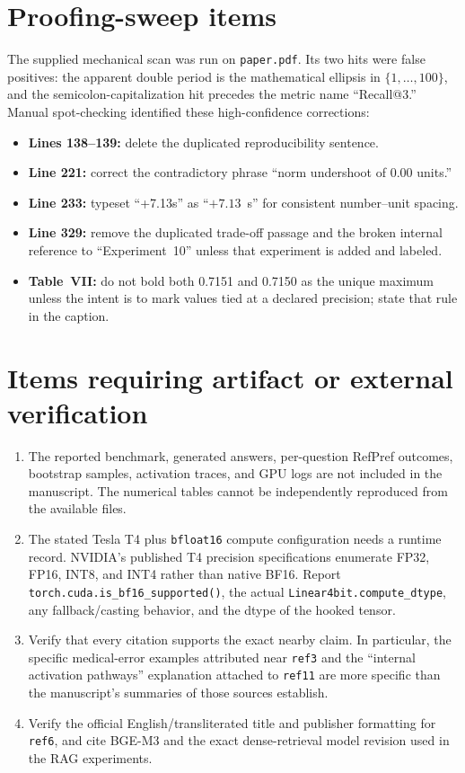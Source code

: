 \documentclass[11pt]{article}
\newcommand{\status}[1]{\textbf{#1}}
\begin{document}
\section*{Proofing-sweep items}

The supplied mechanical scan was run on \texttt{paper.pdf}.  Its two hits were false positives: the apparent double period is the mathematical ellipsis in $\{1,\ldots,100\}$, and the semicolon-capitalization hit precedes the metric name ``Recall@3.''  Manual spot-checking identified these high-confidence corrections:

\begin{itemize}
    \item \status{Lines 138--139:} delete the duplicated reproducibility sentence.
    \item \status{Line 221:} correct the contradictory phrase ``norm undershoot of $0.00$ units.''
    \item \status{Line 233:} typeset ``+7.13s'' as ``$+7.13$~s'' for consistent number--unit spacing.
    \item \status{Line 329:} remove the duplicated trade-off passage and the broken internal reference to ``Experiment~10'' unless that experiment is added and labeled.
    \item \status{Table~VII:} do not bold both 0.7151 and 0.7150 as the unique maximum unless the intent is to mark values tied at a declared precision; state that rule in the caption.
\end{itemize}

\section*{Items requiring artifact or external verification}

\begin{enumerate}
    \item The reported benchmark, generated answers, per-question RefPref outcomes, bootstrap samples, activation traces, and GPU logs are not included in the manuscript.  The numerical tables cannot be independently reproduced from the available files.
    \item The stated Tesla T4 plus \texttt{bfloat16} compute configuration needs a runtime record.  NVIDIA's published T4 precision specifications enumerate FP32, FP16, INT8, and INT4 rather than native BF16.  Report \texttt{torch.cuda.is\_bf16\_supported()}, the actual \texttt{Linear4bit.compute\_dtype}, any fallback/casting behavior, and the dtype of the hooked tensor.
    \item Verify that every citation supports the exact nearby claim.  In particular, the specific medical-error examples attributed near \texttt{ref3} and the ``internal activation pathways'' explanation attached to \texttt{ref11} are more specific than the manuscript's summaries of those sources establish.
    \item Verify the official English/transliterated title and publisher formatting for \texttt{ref6}, and cite BGE-M3 and the exact dense-retrieval model revision used in the RAG experiments.
\end{enumerate}
\end{document}
